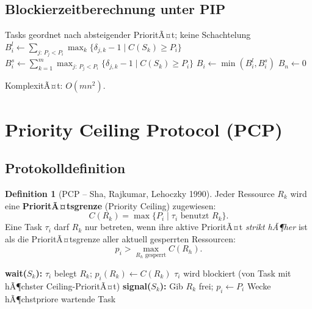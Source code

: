 ﻿\documentclass[a4paper,12pt]{report}
\theoremstyle{definition}
\newtheorem{definition}{Definition}[chapter]
\begin{document}
\subsection{Blockierzeitberechnung unter PIP}

\begin{algorithmic}[1]
	\Require Tasks geordnet nach absteigender PrioritÃ¤t; keine Schachtelung
	\State $B_i^l \leftarrow \sum_{j:\,P_j < P_i} \max_k\{\delta_{j,k}-1 \mid C(S_k) \geq P_i\}$
	\State $B_i^s \leftarrow \sum_{k=1}^m \max_{j:\,P_j < P_i}\{\delta_{j,k}-1 \mid C(S_k) \geq P_i\}$
	\State $B_i \leftarrow \min(B_i^l, B_i^s)$
	\EndFor
	\State $B_n \leftarrow 0$
\end{algorithmic}

KomplexitÃ¤t: $O(mn^2)$.

\section{Priority Ceiling Protocol (PCP)}

\subsection{Protokolldefinition}

\begin{definition}[PCP -- Sha, Rajkumar, Lehoczky 1990]
	Jeder Ressource $R_k$ wird eine \textbf{PrioritÃ¤tsgrenze} (Priority Ceiling)
	zugewiesen:
	\[
		C(R_k) = \max\{P_i \mid \tau_i \text{ benutzt } R_k\}.
	\]
	Eine Task $\tau_i$ darf $R_k$ nur betreten, wenn ihre aktive PrioritÃ¤t
	\emph{strikt hÃ¶her} ist als die PrioritÃ¤tsgrenze aller aktuell gesperrten
	Ressourcen:
	\[
		p_i > \max_{R_h \text{ gesperrt}} C(R_h).
	\]
\end{definition}

\begin{algorithm}[H]
	\caption{Priority Ceiling Protocol (PCP)}
	\begin{algorithmic}[1]
		\State \textbf{wait($S_k$):}
		\State $\tau_i$ belegt $R_k$; $p_i(R_k) \leftarrow C(R_k)$
		\Else
		\State $\tau_i$ wird blockiert (von Task mit hÃ¶chster Ceiling-PrioritÃ¤t)
		\EndIf
		\State
		\State \textbf{signal($S_k$):}
		\State Gib $R_k$ frei; $p_i \leftarrow P_i$ 
		\State Wecke hÃ¶chstpriore wartende Task
	\end{algorithmic}
\end{algorithm}
\end{document}
